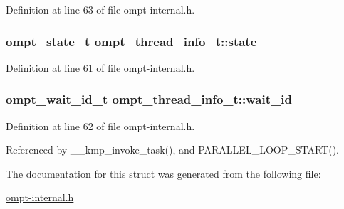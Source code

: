 Definition at line 63 of file ompt-\/internal.\-h.

\hypertarget{structompt__thread__info__t_afeb7d0d4a4e6602ecebd9f2adf87580f}{
\subsubsection[{state}]{\setlength{\rightskip}{0pt plus 5cm}ompt\-\_\-state\-\_\-t ompt\-\_\-thread\-\_\-info\-\_\-t\-::state}}\label{structompt__thread__info__t_afeb7d0d4a4e6602ecebd9f2adf87580f}


Definition at line 61 of file ompt-\/internal.\-h.

\hypertarget{structompt__thread__info__t_a8655f45d3e0fe40c28f0a49076a560c3}{
\subsubsection[{wait\-\_\-id}]{\setlength{\rightskip}{0pt plus 5cm}ompt\-\_\-wait\-\_\-id\-\_\-t ompt\-\_\-thread\-\_\-info\-\_\-t\-::wait\-\_\-id}}\label{structompt__thread__info__t_a8655f45d3e0fe40c28f0a49076a560c3}


Definition at line 62 of file ompt-\/internal.\-h.



Referenced by \-\_\-\-\_\-kmp\-\_\-invoke\-\_\-task(), and P\-A\-R\-A\-L\-L\-E\-L\-\_\-\-L\-O\-O\-P\-\_\-\-S\-T\-A\-R\-T().



The documentation for this struct was generated from the following file\-:\begin{DoxyCompactItemize}
\item 
\hyperlink{ompt-internal_8h}{ompt-\/internal.\-h}\end{DoxyCompactItemize}
